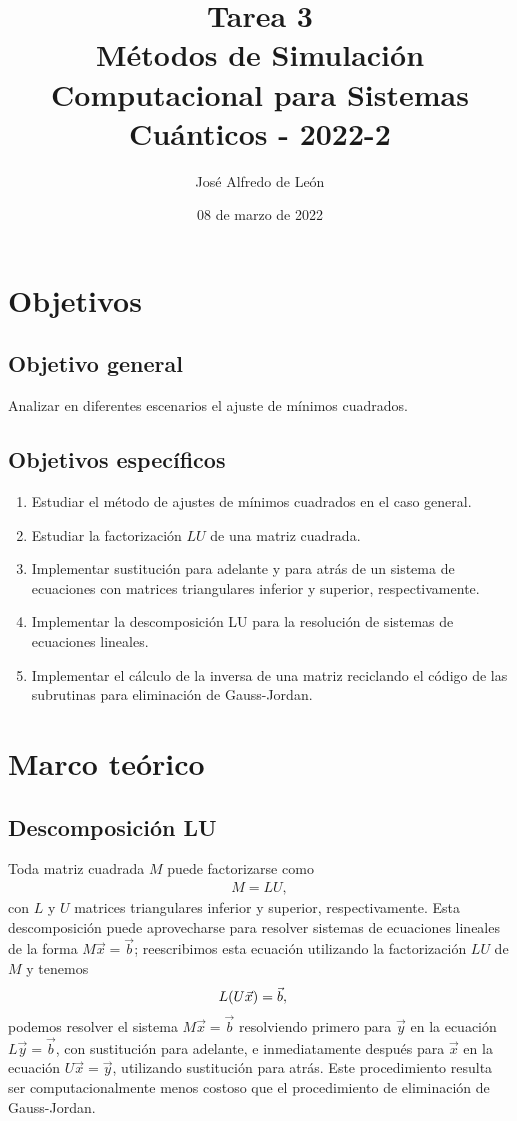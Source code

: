 \documentclass[11pt,letterpaper]{article}
\author{José Alfredo de León}
\title{Tarea 3\\
\large{Métodos de Simulación Computacional para Sistemas Cuánticos - 2022-2}}
\begin{document}
\date{08 de marzo de 2022}
\maketitle
 	
\section{Objetivos}
\subsection{Objetivo general}
Analizar en diferentes escenarios el ajuste de mínimos cuadrados.

\subsection{Objetivos específicos}
\begin{enumerate}
\item Estudiar el método de ajustes de mínimos cuadrados en el caso 
general.
\item Estudiar la factorización $LU$ de una matriz cuadrada.
\item Implementar sustitución para adelante y para atrás de
un sistema de ecuaciones con matrices triangulares 
inferior y superior, respectivamente.
\item Implementar la descomposición LU para la resolución de sistemas
de ecuaciones lineales.
\item Implementar el cálculo de la inversa de una matriz reciclando el código
de las subrutinas para eliminación de Gauss-Jordan.
\end{enumerate}

\section{Marco teórico}
\subsection{Descomposición LU}
Toda matriz cuadrada $M$ puede factorizarse como
\begin{align}
M=LU,
\end{align}
con $L$ y $U$ matrices triangulares inferior y superior, respectivamente.
Esta descomposición puede aprovecharse para resolver sistemas de ecuaciones
lineales de la forma $M\vec x=\vec b$; reescribimos esta ecuación
utilizando la factorización $LU$ de $M$ y tenemos
\begin{align}
L\qty(U\vec{x})&=\vec{b},
\end{align}
podemos resolver el sistema $M \vec x=\vec b$ resolviendo primero para $\vec y$
en la ecuación $L\vec y=\vec b$, con sustitución para adelante,
e inmediatamente después para $\vec x$ en la ecuación $U\vec x=\vec y$, 
utilizando sustitución para atrás. Este procedimiento resulta ser
computacionalmente menos costoso que el procedimiento de eliminación
de Gauss-Jordan. 
\end{document}
